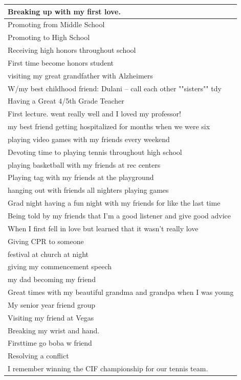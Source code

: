 \documentclass[
  .7em,
  letterpaper,
  DIV=11,
  numbers=noendperiod]{scrartcl}
\begin{document}
\begin{table}
\begin{tabular}{l}
\hline
Breaking up with my first love.\\
\hline
Promoting from Middle School\\
\hline
Promoting to High School\\
\hline
Receiving high honors throughout school\\
\hline
First time become honors student\\
\hline
visiting my great grandfather with Alzheimers\\
\hline
W/my best childhood friend: Dulani -- call each other ""sisters"" tdy\\
\hline
Having a Great 4/5th Grade Teacher\\
\hline
First lecture. went really well and I loved my professor!\\
\hline
my best friend getting hospitalized for months when we were six\\
\hline
playing video games with my friends every weekend\\
\hline
Devoting time to playing tennis throughout high school\\
\hline
playing basketball with my friends at rec centers\\
\hline
Playing tag with my friends at the playground\\
\hline
hanging out with friends all nighters playing games\\
\hline
Grad night having a fun night with my friends for like the last time\\
\hline
Being told by my friends that I'm a good listener and give good advice\\
\hline
When I first fell in love but learned that it wasn’t really love\\
\hline
Giving CPR to someone\\
\hline
festival at church at night\\
\hline
giving my commencement speech\\
\hline
my dad becoming my friend\\
\hline
Great times with my beautiful grandma and grandpa when I was young\\
\hline
My senior year friend group\\
\hline
Visiting my friend at Vegas\\
\hline
Breaking my wrist and hand.\\
\hline
Firsttime go boba w friend\\
\hline
Resolving a conflict\\
\hline
I remember winning the CIF championship for our tennis team.\\

\end{tabular}
\end{table}
\end{document}
